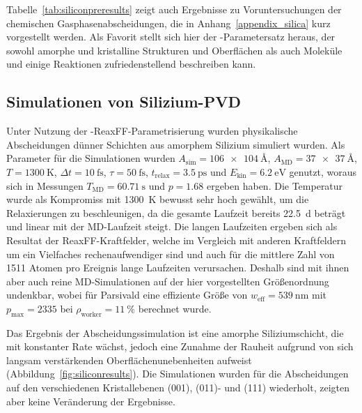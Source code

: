 Tabelle~\ref{tab:siliconpreresults} zeigt auch Ergebnisse zu Voruntersuchungen der chemischen Gasphasenabscheidungen, die in Anhang~\ref{appendix_silica} kurz vorgestellt werden.
Als Favorit stellt sich hier der -Parametersatz heraus, der sowohl amorphe und kristalline Strukturen und Oberflächen als auch Moleküle und einige Reaktionen zufriedenstellend beschreiben kann.

\subsection{Simulationen von Silizium-PVD}

Unter Nutzung der -ReaxFF-Parametrisierung wurden physikalische Abscheidungen dünner Schichten aus amorphem Silizium simuliert wurden.
Als Parameter für die Simulationen wurden $A_\text{sim} = \SI{106x104}{\angstrom}$, $A_\text{MD} = \SI{37x37}{\angstrom}$, $T = \SI{1300}{\kelvin}$, $\Delta t = \SI{10}{\femto\second}$, $\tau = \SI{50}{\femto\second}$, $t_\text{relax} = \SI{3.5}{\pico\second}$ und $E_\text{kin} = \SI{6.2}{\electronvolt}$ genutzt, woraus sich in Messungen $T_\text{MD} = \SI{60.71}{\second}$ und $p = \num{1.68}$ ergeben haben.
Die Temperatur wurde als Kompromiss mit \SI{1300}{\kelvin} bewusst sehr hoch gewählt, um die Relaxierungen zu beschleunigen, da die gesamte Laufzeit bereits \SI{22.5}{\day} beträgt und linear mit der MD-Laufzeit steigt.
Die langen Laufzeiten ergeben sich als Resultat der ReaxFF-Kraftfelder, welche im Vergleich mit anderen Kraftfeldern um ein Vielfaches rechenaufwendiger sind und auch für die mittlere Zahl von \num{1511} Atomen pro Ereignis lange Laufzeiten verursachen.
Deshalb sind mit ihnen aber auch reine MD-Simulationen auf der hier vorgestellten Größenordnung undenkbar, wobei für Parsivald eine effiziente Größe von $w_\text{eff} = \SI{539}{\nano\meter}$ mit $p_\text{max} = 2335$ bei $\rho_\text{worker} = \SI{11}{\percent}$ berechnet wurde.

Das Ergebnis der Abscheidungssimulation ist eine amorphe Siliziumschicht, die mit konstanter Rate wächst, jedoch eine Zunahme der Rauheit aufgrund von sich langsam verstärkenden Oberflächenunebenheiten aufweist (Abbildung~\ref{fig:siliconresults}).
Die Simulationen wurden für die Abscheidungen auf den verschiedenen Kristallebenen (001), (011)- und (111) wiederholt, zeigten aber keine Veränderung der Ergebnisse.

